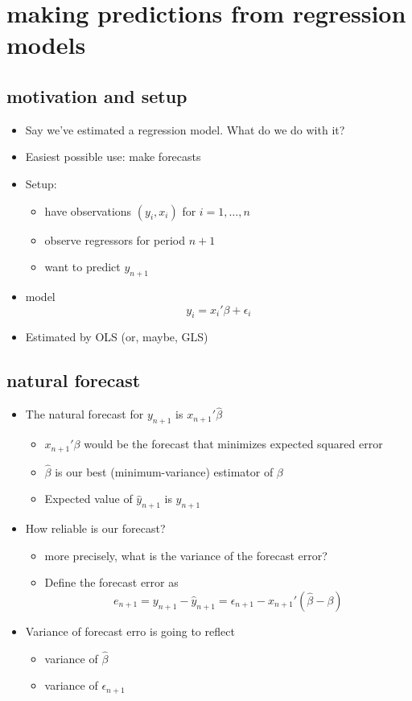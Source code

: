 \section{making predictions from regression models}

\subsection{motivation and setup}
\begin{itemize}
\item Say we've estimated a regression model.  What do we do with it?
\item Easiest possible use: make forecasts
\item Setup:
\begin{itemize}
\item have observations $(y_i, x_i)$ for $i = 1,\dots,n$
\item observe regressors for period $n+1$
\item want to predict $y_{n+1}$
\end{itemize}
\item model
       \[ y_i  = x_i'\beta + \epsilon_i \]
\item Estimated by OLS (or, maybe, GLS)
\end{itemize}

\subsection{natural forecast}

\begin{itemize}
\item The natural forecast for $y_{n+1}$ is $x_{n+1}'\hat\beta$
\begin{itemize}
\item $x_{n+1}'\beta$ would be the forecast that minimizes expected
         squared error
\item $\hat\beta$ is our best (minimum-variance) estimator of $\beta$
\item Expected value of $\hat y_{n+1}$ is $y_{n+1}$
\end{itemize}
\item How reliable is our forecast?
\begin{itemize}
\item more precisely, what is the variance of the forecast error?
\item Define the forecast error as 
         \[ e_{n+1} = y_{n+1} - \hat y_{n+1} = \epsilon_{n+1} -
         x_{n+1}'(\hat\beta - \beta) \]
\end{itemize}
\item Variance of forecast erro is going to reflect
\begin{itemize}
\item variance of $\hat\beta$
\item variance of $\epsilon_{n+1}$
\end{itemize}
\end{itemize}

